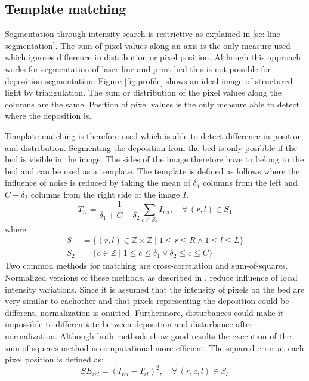 \subsection*{Template matching} \label{ssc: template_matching}
Segmentation through intensity search is restrictive as explained in \ref{sc: line segmentation}. The sum of pixel values along an axis is the only measure used which ignores difference in distribution or pixel position. Although this approach works for segmentation of laser line and print bed this is not possible for deposition segmentation. Figure \ref{fig:profile} shows an ideal image of structured light by triangulation. The sum or distribution of the pixel values along the columns are the same. Position of pixel values is the only measure able to detect where the deposition is. 

Template matching is therefore used which is able to detect difference in position and distribution. Segmenting the deposition from the bed is only posibble if the bed is visible in the image. The sides of the image therefore have to belong to the bed and can be used as a template. The template is defined as follows where the influence of noise is reduced by taking the mean of $\delta_1$ columns from the left and $C-\delta_2$ columns from the right side of the image $I$.
\begin{equation}
T_{rl} = \frac{1}{\delta_1+C-\delta_2}  \sum_{c \in S_2}  I_{rcl}, \quad \forall \, (r,l) \in S_1
\end{equation}
where
\begin{align}
S_1 &= \{(r,l)\in \mathbb {Z} \times \mathbb {Z} \mid 1 \leq r \leq R \land  1 \leq l \leq L \} \\
S_2 &= \{c \in \mathbb {Z} \mid 1 \leq c \leq \delta_1 \lor  \delta_2 \leq c \leq C \} 
\end{align} 
Two common methods for matching are cross-correlation and sum-of-squares. Normalized versions of these methods, as described in \cite{hisham2015template}, reduce influence of local intensity variations. Since it is assumed that the intensity of pixels on the bed are very similar to eachother and that pixels representing the deposition could be different, normalization is omitted. Furthermore, disturbances could make it impossible to differentiate between deposition and disturbance after normalization. Although both methods show good results the execution of the sum-of-squeres method is computational more efficient. The squared error at each pixel position is defined as:
\begin{equation}
SE_{rcl} = \left( I_{rcl} - T_{rl} \right)^2, \quad \forall \, (r,c,l) \in S_3
\end{equation}
